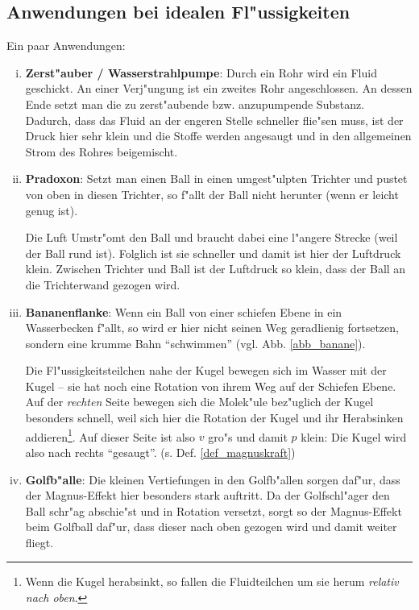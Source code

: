 \subsection{Anwendungen bei idealen Fl"ussigkeiten}
\label{kap_anwendungen-bei-idealen-flussigkeiten}

Ein paar Anwendungen:
\begin{Beispiel}
\begin{enumerate}[(i):]
\item \textbf{Zerst"auber /
     Wasserstrahlpumpe}: Durch ein Rohr wird
   ein Fluid geschickt. An einer Verj"ungung ist ein zweites Rohr
   angeschlossen. An dessen Ende setzt man die zu zerst"aubende
   bzw. anzupumpende Substanz. Dadurch, dass das Fluid an der engeren
   Stelle schneller flie"sen muss, ist der Druck hier sehr klein und
   die Stoffe werden angesaugt und in den allgemeinen Strom des Rohres
   beigemischt.

\item \textbf{Pradoxon}:
   Setzt man einen Ball in einen umgest"ulpten Trichter und pustet von
   oben in diesen Trichter, so f"allt der Ball nicht herunter (wenn er
   leicht genug ist).

   Die Luft Umstr"omt den Ball und braucht dabei eine l"angere Strecke
   (weil der Ball rund ist). Folglich ist sie schneller und damit ist
   hier der Luftdruck klein. Zwischen Trichter und Ball ist der
   Luftdruck so klein, dass der Ball an die Trichterwand gezogen wird.

\item \textbf{Bananenflanke}: Wenn ein Ball von
   einer schiefen Ebene in ein Wasserbecken f"allt, so wird er hier
   nicht seinen Weg geradlienig fortsetzen, sondern eine krumme Bahn
   "`schwimmen"' (vgl. Abb. \ref{abb_banane}).

   Die Fl"ussigkeitsteilchen nahe der Kugel bewegen sich im Wasser mit
   der Kugel -- sie hat noch eine Rotation von ihrem Weg auf der
   Schiefen Ebene. Auf der \emph{rechten} Seite bewegen sich die
   Molek"ule bez"uglich der Kugel besonders schnell, weil sich hier die
   Rotation der Kugel und ihr Herabsinken addieren\footnote{Wenn die
     Kugel herabsinkt, so fallen die Fluidteilchen um sie herum
     \emph{relativ nach oben}.}. Auf dieser Seite ist also $v$ gro"s
   und damit $p$ klein: Die Kugel wird also nach rechts
   "`gesaugt"'. (s. Def. \ref{def_magnuskraft})


\item \textbf{Golfb"alle}: Die kleinen Vertiefungen in
   den Golfb"allen sorgen daf"ur, dass der Magnus-Effekt hier
   besonders stark auftritt. Da der Golfschl"ager den Ball schr"ag
   abschie"st und in Rotation versetzt, sorgt so der Magnus-Effekt
   beim Golfball daf"ur, dass dieser nach oben gezogen wird und damit
   weiter fliegt.
\end{enumerate}
\end{Beispiel}

